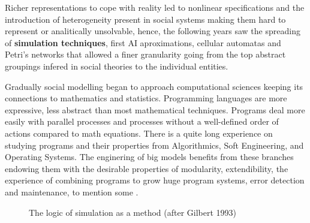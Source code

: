 \documentclass[11pt,oneside,a4paper,openright]{report}
\begin{document}
Richer representations to cope with reality led to nonlinear specifications and the introduction of heterogeneity present in social systems making them hard to represent or analitically unsolvable, hence, the following years saw the spreading of \textbf{simulation techniques}, first AI aproximations, cellular automatas and Petri's networks that allowed a finer granularity going from the top abstract groupings infered in social theories to the individual entities.\\


Gradually social modelling began to approach computational sciences keeping its connections to mathematics and statistics. Programming languages are more expressive, less abstract than most mathematical techniques. Programs deal more easily with parallel processes and processes without a well-defined order of actions compared to math equations. There is a quite long experience on studying programs and their properties from Algorithmics, Soft Engineering, and Operating Systems. The enginering of big models benefits from these branches endowing them with the desirable properties of modularity, extendibility, the experience of combining programs to grow huge program systems, error detection and maintenance, to mention some \cite{TaberAndTimpone1996}.

\begin{figure}[h]
\centering
\setlength\fboxsep{0pt}
\setlength\fboxrule{0.5pt}
\caption{The logic of simulation as a method (after Gilbert 1993)\cite{GilbertTroitzsch}}
\label{fig:SimLog}
\end{figure}
\end{document}
